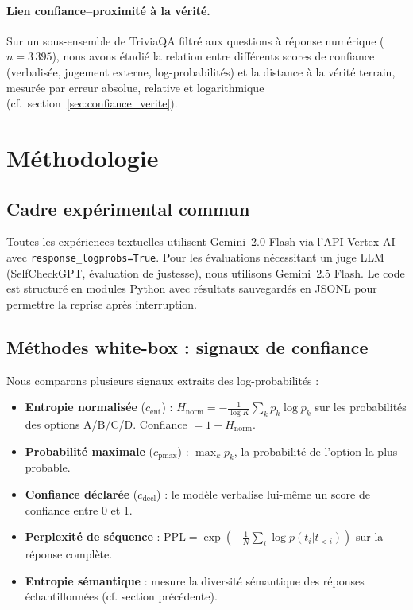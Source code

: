 \documentclass[a4paper, 11pt]{article}
\begin{document}
\paragraph{Lien confiance--proximité à la vérité.}
Sur un sous-ensemble de TriviaQA filtré aux questions à réponse numérique ($n=3\,395$), nous avons étudié la relation entre différents scores de confiance (verbalisée, jugement externe, log-probabilités) et la distance à la vérité terrain, mesurée par erreur absolue, relative et logarithmique (cf.\ section~\ref{sec:confiance_verite}).
\section{Méthodologie}
\subsection{Cadre expérimental commun}
Toutes les expériences textuelles utilisent Gemini~2.0 Flash via l'API Vertex AI avec \texttt{response\_logprobs=True}. Pour les évaluations nécessitant un juge LLM (SelfCheckGPT, évaluation de justesse), nous utilisons Gemini~2.5 Flash. Le code est structuré en modules Python avec résultats sauvegardés en JSONL pour permettre la reprise après interruption.
\subsection{Méthodes white-box : signaux de confiance}
Nous comparons plusieurs signaux extraits des log-probabilités :
\begin{itemize}[nosep]
    \item \textbf{Entropie normalisée} ($c_\text{ent}$) : $H_\text{norm} = -\frac{1}{\log K}\sum_{k} p_k \log p_k$ sur les probabilités des options A/B/C/D. Confiance $= 1 - H_\text{norm}$.
    \item \textbf{Probabilité maximale} ($c_\text{pmax}$) : $\max_k p_k$, la probabilité de l'option la plus probable.
    \item \textbf{Confiance déclarée} ($c_\text{decl}$) : le modèle verbalise lui-même un score de confiance entre 0 et 1.
    \item \textbf{Perplexité de séquence} : $\text{PPL} = \exp\left(-\frac{1}{N}\sum_i \log p(t_i | t_{<i})\right)$ sur la réponse complète.
    \item \textbf{Entropie sémantique} : mesure la diversité sémantique des réponses échantillonnées (cf. section précédente).
\end{itemize}
\end{document}
